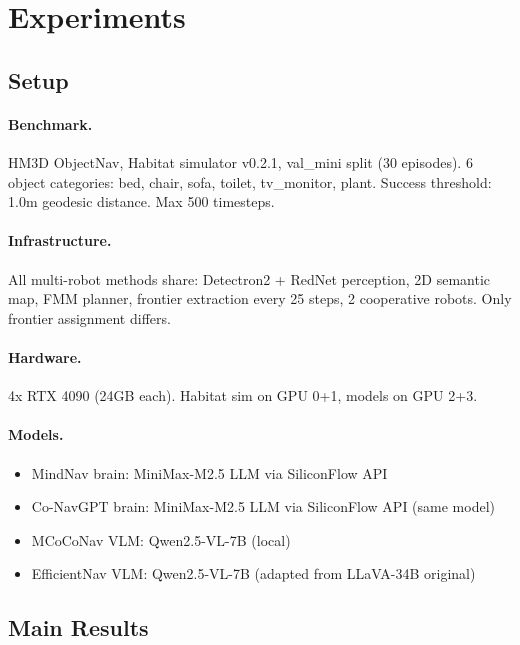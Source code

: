 \section{Experiments}

\subsection{Setup}

\paragraph{Benchmark.} HM3D ObjectNav, Habitat simulator v0.2.1, val\_mini split (30 episodes).
6 object categories: bed, chair, sofa, toilet, tv\_monitor, plant.
Success threshold: 1.0m geodesic distance. Max 500 timesteps.

\paragraph{Infrastructure.} All multi-robot methods share:
Detectron2 + RedNet perception, 2D semantic map, FMM planner, frontier extraction every 25 steps, 2 cooperative robots.
Only frontier assignment differs.

\paragraph{Hardware.} 4x RTX 4090 (24GB each). Habitat sim on GPU 0+1, models on GPU 2+3.

\paragraph{Models.}
\begin{itemize}
    \item MindNav brain: MiniMax-M2.5 LLM via SiliconFlow API
    \item Co-NavGPT brain: MiniMax-M2.5 LLM via SiliconFlow API (same model)
    \item MCoCoNav VLM: Qwen2.5-VL-7B (local)
    \item EfficientNav VLM: Qwen2.5-VL-7B (adapted from LLaVA-34B original)
\end{itemize}

\subsection{Main Results}

